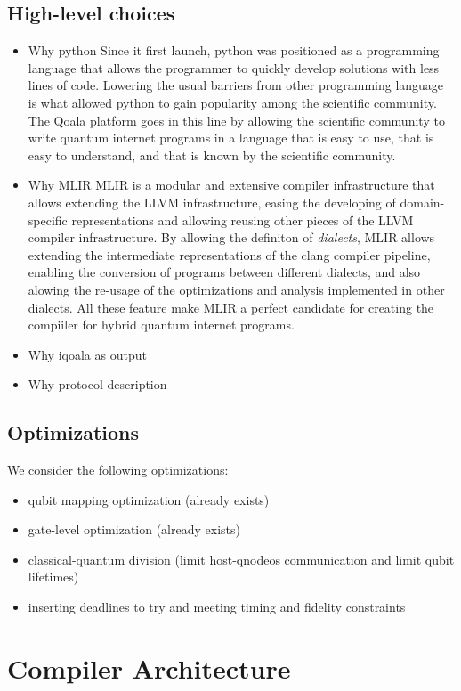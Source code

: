 \subsection{High-level choices}
\begin{itemize}
\item Why python
  Since it first launch, python was positioned as a programming language that allows the programmer to quickly develop
  solutions with less lines of code. Lowering the usual barriers from other programming language is what allowed python
  to gain popularity among the scientific community.
  The Qoala platform goes in this line by allowing the scientific community to write quantum internet programs in a
  language that is easy to use, that is easy to understand, and that is known by the scientific community.
\item Why MLIR
  MLIR is a modular and extensive compiler infrastructure that allows extending the LLVM infrastructure, easing the
  developing of domain-specific representations and allowing reusing other pieces of the LLVM compiler infrastructure.
  By allowing the definiton of \textit{dialects}, MLIR allows extending the intermediate representations of the clang compiler
  pipeline, enabling the conversion of programs between different dialects, and also alowing the re-usage of the
  optimizations and analysis implemented in other dialects.
  All these feature make MLIR a perfect candidate for creating the compiiler for hybrid quantum internet programs.
\item Why iqoala as output
\item Why protocol description
\end{itemize}
    

\subsection{Optimizations}
We consider the following optimizations:
\begin{itemize}
\item qubit mapping optimization (already exists)
\item gate-level optimization (already exists)
\item classical-quantum division (limit host-qnodeos communication and limit qubit lifetimes)
\item inserting deadlines to try and meeting timing and fidelity constraints
\end{itemize}


\section{Compiler Architecture}


